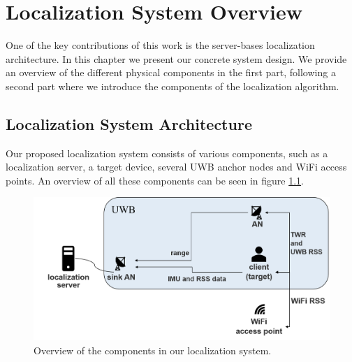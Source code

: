 
\chapter{Localization System Overview} %

\label{Chapter4} %
One of the key contributions of this work is the server-bases localization architecture. In this chapter we present our concrete system design. We provide an overview of the different physical components in the first part, following a second part where we introduce the components of the localization algorithm. 


\section{Localization System Architecture}
Our proposed localization system consists of various components, such as a localization server, a target device, several UWB anchor nodes and WiFi access points. An overview of all these components can be seen in figure \ref{fig:system_components}.\\
\begin{figure}[th]
\centering
\includegraphics[width=1.0\textwidth]{Figures/system_components}
\decoRule
\caption[System Architecture]{Overview of the components in our localization system.}
\label{fig:system_components}
\end{figure}

